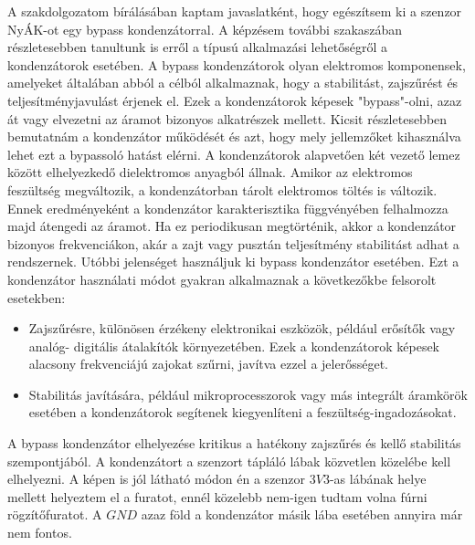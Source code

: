 A szakdolgozatom bírálásában kaptam javaslatként, hogy egészítsem ki a szenzor NyÁK-ot egy bypass kondenzátorral. A képzésem további szakaszában részletesebben tanultunk is erről a típusú alkalmazási lehetőségről a kondenzátorok esetében. A bypass kondenzátorok olyan elektromos komponensek, amelyeket általában abból a célból alkalmaznak, hogy a stabilitást, zajszűrést és teljesítményjavulást érjenek el. Ezek a kondenzátorok képesek "bypass"-olni, azaz át vagy elvezetni az áramot bizonyos alkatrészek mellett. Kicsit részletesebben bemutatnám a kondenzátor működését és azt, hogy mely jellemzőket kihasználva lehet ezt a bypassoló hatást elérni. A kondenzátorok alapvetően két vezető lemez között elhelyezkedő dielektromos anyagból állnak. Amikor az elektromos feszültség megváltozik, a kondenzátorban tárolt elektromos töltés is változik. Ennek eredményeként a kondenzátor karakterisztika függvényében felhalmozza majd átengedi az áramot. Ha ez periodikusan megtörténik, akkor a kondenzátor bizonyos frekvenciákon, akár a zajt vagy pusztán teljesítmény stabilitást adhat a rendszernek. Utóbbi jelenséget használjuk ki bypass kondenzátor esetében. Ezt a kondenzátor használati módot gyakran alkalmaznak a következőkbe felsorolt esetekben:

\begin{itemize}
	\item Zajszűrésre, különösen érzékeny elektronikai eszközök, például erősítők vagy analóg- digitális átalakítók környezetében. Ezek a kondenzátorok képesek alacsony frekvenciájú zajokat szűrni, javítva ezzel a jelerősséget.
	\item Stabilitás javítására, például mikroprocesszorok vagy más integrált áramkörök esetében a kondenzátorok segítenek kiegyenlíteni a feszültség-ingadozásokat.
\end{itemize}



A bypass kondenzátor elhelyezése kritikus a hatékony zajszűrés és kellő stabilitás szempontjából. A kondenzátort a szenzort tápláló lábak közvetlen közelébe kell elhelyezni. A képen is jól látható módon én a szenzor $3V3$-as lábának helye mellett helyeztem el a furatot, ennél közelebb nem-igen tudtam volna fúrni rögzítőfuratot. A $GND$ azaz föld a kondenzátor másik lába esetében annyira már nem fontos.

